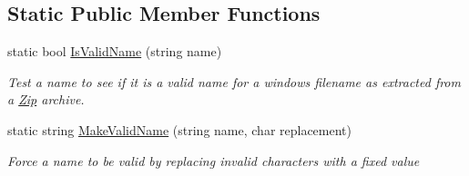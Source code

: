 \subsection*{Static Public Member Functions}
\begin{DoxyCompactItemize}
\item 
static bool \hyperlink{class_i_c_sharp_code_1_1_sharp_zip_lib_1_1_zip_1_1_windows_name_transform_a0bcbd4b7a2b1e8dc292da72739efcb37}{Is\+Valid\+Name} (string name)
\begin{DoxyCompactList}\small\item\em Test a name to see if it is a valid name for a windows filename as extracted from a \hyperlink{namespace_i_c_sharp_code_1_1_sharp_zip_lib_1_1_zip}{Zip} archive. \end{DoxyCompactList}\item 
static string \hyperlink{class_i_c_sharp_code_1_1_sharp_zip_lib_1_1_zip_1_1_windows_name_transform_af79a913adc32852ac1ba2acdc0394f69}{Make\+Valid\+Name} (string name, char replacement)
\begin{DoxyCompactList}\small\item\em Force a name to be valid by replacing invalid characters with a fixed value \end{DoxyCompactList}\end{DoxyCompactItemize}
